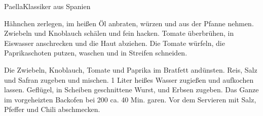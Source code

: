 \begin{recipe}{Paella}{Klassiker aus Spanien}
  \label{Paella}
  \inglist
  
  \steps
  Hähnchen zerlegen, im heißen Öl anbraten, würzen und aus der Pfanne nehmen. Zwiebeln 
  und Knoblauch schälen und fein hacken. Tomate überbrühen, in Eiswasser anschrecken und 
  die Haut abziehen. Die Tomate würfeln, die Paprikaschoten putzen, waschen und in 
  Streifen schneiden. 
  
  Die Zwiebeln, Knoblauch, Tomate und Paprika im Bratfett andünsten. Reis, Salz und 
  Safran zugeben und mischen. 1 Liter heißes Wasser zugießen und aufkochen lassen. 
  Geflügel, in Scheiben geschnittene Wurst, und Erbsen zugeben. Das Ganze im vorgeheizten 
  Backofen bei 200 \celsius ca. 40 Min. garen. Vor dem Servieren mit Salz, Pfeffer und
  Chili abschmecken.
\end{recipe}


